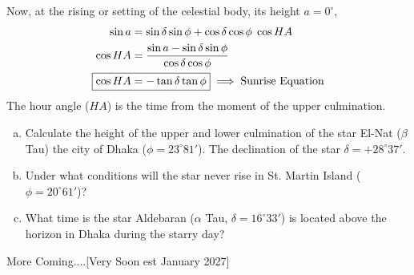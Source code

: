 \documentclass[a4paper,12pt]{extarticle}
\begin{document}
Now, at the rising or setting of the celestial body,
its height $a=0^\circ$,
\begin{align*}
	\sin a &= \sin \delta \sin \phi + \cos \delta \cos \phi \; \cos HA\\
	\cos HA&=\frac{\sin a -\sin \delta \sin \phi}{\cos \delta \cos \phi}\\
	\Aboxed{\cos HA&= - \tan \delta \tan \phi} \implies \text{Sunrise Equation}
\end{align*}
The hour angle ($HA$) is the time from the moment of the upper culmination.\\

\begin{pro}
	\begin{enumerate}[a.]
		\itemsep0em
		\item Calculate the height of the upper and lower culmination of the star El-Nat ($\beta$ Tau) the city of Dhaka ($\phi =23^\circ 81'$). The declination of the star $\delta =+ 28^\circ 37'$.  
		\item Under what conditions will the star never rise in St. Martin Island ($\phi =20^\circ 61'$)? 
		\item What time is the star Aldebaran ($\alpha$ Tau, $\delta=16^\circ33'$) is located above the horizon in Dhaka during the starry day?
	\end{enumerate}
\end{pro}

More Coming....[Very Soon est January 2027]









\clearpage
\end{document}
